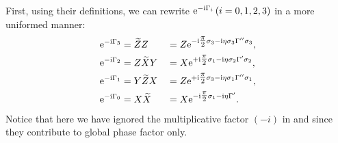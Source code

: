 \documentclass[pra,reprint,superscriptaddress]{revtex4-2}
\newcommand{\wt}[1]{\widetilde{#1}}
\begin{document}
First, using their definitions, we can rewrite $\mathrm{e}^{-\mathrm{i}\Gamma_i}\, (i=0,1,2,3)$  in a more uniformed manner: 
\begin{subequations} \label{app:PDDnp-expGamma}
 \begin{align}
 \label{app:PDDnp-expGamma3}
\upe^{-\upi \Gamma_3} &=\wt Z Z &&=
Z \upe^{-\upi  \tfrac{\pi}{2} \sigma_3 -\upi \eta \sigma_3\Gamma''\sigma_3},\\
\label{app:PDDnp-expGamma2}
\upe^{-\upi \Gamma_2} &= Z \wt X Y &&=
X \upe^{+\upi  \tfrac{\pi}{2} \sigma_1 -\upi \eta \sigma_2\Gamma'\sigma_2},\\
\label{app:PDDnp-expGamma1}
\upe^{-\upi \Gamma_1} &= Y \wt Z X &&=
Z \upe^{+\upi  \tfrac{\pi}{2} \sigma_3 -\upi \eta \sigma_1\Gamma''\sigma_1},\\
\label{app:PDDnp-expGamma0}
\upe^{-\upi \Gamma_0} &= X \wt X &&= 
X \upe^{-\upi  \tfrac{\pi}{2} \sigma_1 -\upi \eta\Gamma'}.
\end{align}
\end{subequations}
Notice that here we have ignored the multiplicative factor $(-i)$ in  and  since they contribute to global phase factor only.
\end{document}
